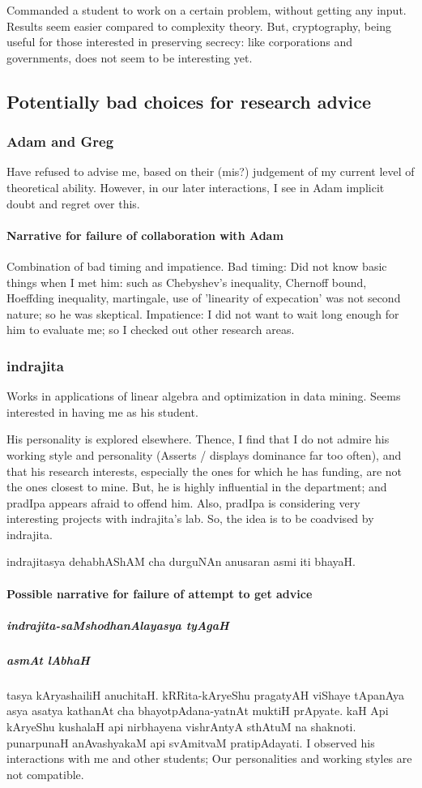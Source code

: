 \documentclass[oneside, article]{memoir}
\begin{document}
Commanded a student to work on a certain problem, without getting any input. Results seem easier compared to complexity theory. But, cryptography, being useful for those interested in preserving secrecy: like corporations and governments, does not seem to be interesting yet.

\subsection{Potentially bad choices for research advice}
\subsubsection{Adam and Greg}
Have refused to advise me, based on their (mis?) judgement of my current level of theoretical ability. However, in our later interactions, I see in Adam implicit doubt and regret over this.

\paragraph*{Narrative for failure of collaboration with Adam} Combination of bad timing and impatience. Bad timing: Did not know basic things when I met him: such as Chebyshev's inequality, Chernoff bound, Hoeffding inequality, martingale, use of 'linearity of expecation' was not second nature; so he was skeptical. Impatience: I did not want to wait long enough for him to evaluate me; so I checked out other research areas.

\subsubsection{indrajita}
Works in applications of linear algebra and optimization in data mining. Seems interested in having me as his student.

His personality is explored elsewhere. Thence, I find that I do not admire his working style and personality (Asserts / displays dominance far too often), and that his research interests, especially the ones for which he has funding, are not the ones closest to mine. But, he is highly influential in the department; and pradIpa appears afraid to offend him. Also, pradIpa is considering very interesting projects with indrajita's lab. So, the idea is to be coadvised by indrajita.

indrajitasya dehabhAShAM cha durguNAn anusaran asmi iti bhayaH.

\paragraph*{Possible narrative for failure of attempt to get advice}
\subparagraph{indrajita-saMshodhanAlayasya tyAgaH}
\subparagraph{asmAt lAbhaH}
tasya kAryashailiH anuchitaH. kRRita-kAryeShu pragatyAH viShaye tApanAya asya asatya kathanAt cha bhayotpAdana-yatnAt muktiH prApyate. kaH Api kAryeShu kushalaH api nirbhayena vishrAntyA sthAtuM na shaknoti. punarpunaH anAvashyakaM api svAmitvaM pratipAdayati. I observed his interactions with me and other students; Our personalities and working styles are not compatible.
\end{document}
